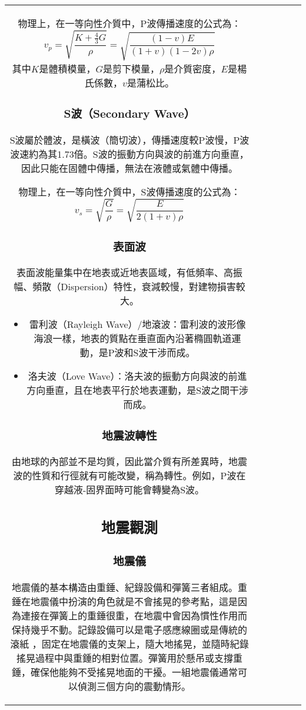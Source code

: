 \documentclass[a4paper,12pt]{report}
\begin{document}
\begin{tabular}{|c|c|c|c|c|c|}
物理上，在一等向性介質中，P波傳播速度的公式為：
$$\displaystyle v_{p}={\sqrt {\frac {K+{\frac {4}{3}}G}{\rho }}}={\sqrt {\frac {(1-v)E}{(1+v)(1-2v)\rho }}}$$
其中$\displaystyle K$是體積模量，$\displaystyle G$是剪下模量，$\displaystyle \rho $是介質密度，$\displaystyle E$是楊氏係數，$\displaystyle v$是蒲松比。
\subsubsection{S波（Secondary Wave）}
S波屬於體波，是橫波（簡切波），傳播速度較P波慢，P波波速約為其1.73倍。S波的振動方向與波的前進方向垂直，因此只能在固體中傳播，無法在液體或氣體中傳播。

物理上，在一等向性介質中，S波傳播速度的公式為：
$$\displaystyle v_{s}={\sqrt {\frac {G}{\rho }}}={\sqrt {\frac {E}{2(1+v)\rho }}}$$
\subsubsection{表面波}
表面波能量集中在地表或近地表區域，有低頻率、高振幅、頻散（Dispersion）特性，衰減較慢，對建物損害較大。
\begin{itemize}
\item 雷利波（Rayleigh Wave）/地滾波：雷利波的波形像海浪一樣，地表的質點在垂直面內沿著橢圓軌道運動，是P波和S波干涉而成。
\item 洛夫波（Love Wave）：洛夫波的振動方向與波的前進方向垂直，且在地表平行於地表運動，是S波之間干涉而成。
\end{itemize}
\subsubsection{地震波轉性}
由地球的內部並不是均質，因此當介質有所差異時，地震波的性質和行徑就有可能改變，稱為轉性。例如，P波在穿越液-固界面時可能會轉變為S波。
\subsection{地震觀測}
\subsubsection{地震儀}
地震儀的基本構造由重錘、紀錄設備和彈簧三者組成。重錘在地震儀中扮演的角色就是不會搖晃的參考點，這是因為連接在彈簧上的重錘很重，在地震中會因為慣性作用而保持幾乎不動。記錄設備可以是電子感應線圈或是傳統的滾紙 ，固定在地震儀的支架上，隨大地搖晃，並隨時紀錄搖晃過程中與重錘的相對位置。彈簧用於懸吊或支撐重錘，確保他能夠不受搖晃地面的干擾。一組地震儀通常可以偵測三個方向的震動情形。

\end{tabular}
\end{document}

